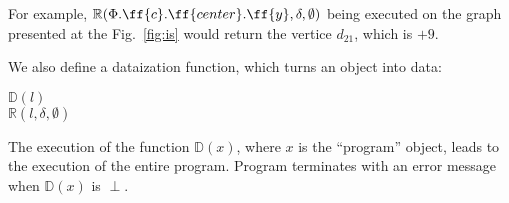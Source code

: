 For example, $\mathbb{R}(\Phi.\ff{c}.\ff{center}.\ff{y},
\delta, \emptyset)$ being executed on the graph presented at the
Fig.~\ref{fig:is} would return the vertice $d_{21}$, which is $+9$.

We also define a dataization function, which turns an object into data:

\begin{algo}
 $\mathbb{D}(l)$ \\
  \tab {} $\mathbb{R}(l, \delta, \emptyset)$ \\
\end{algo}

The execution of the function $\mathbb{D}(x)$, where $x$ is the
``program'' object, leads to the execution of the entire program.
Program terminates with an error message when $\mathbb{D}(x)$ is $\perp$.

